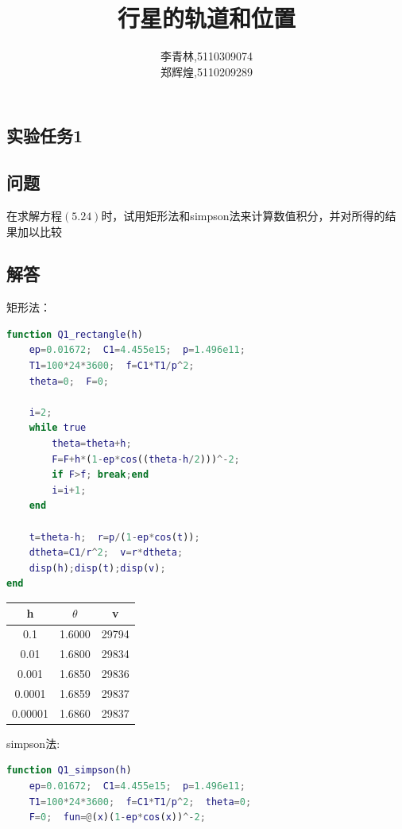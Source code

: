 \documentclass[12pt]{article}
\begin{document}
\begin{CJK*}{UTF8}{gbsn}

\date{}
\title{行星的轨道和位置}
\author{李青林,5110309074\\郑辉煌,5110209289}
\maketitle

\section{实验任务1}
\subsection*{问题}
在求解方程$(5.24)$时，试用矩形法和simpson法来计算数值积分，并对所得的结果加以比较

\subsection*{解答}
矩形法：\\
\begin{lstlisting}[language = matlab]
function Q1_rectangle(h)
    ep=0.01672;  C1=4.455e15;  p=1.496e11;
    T1=100*24*3600;  f=C1*T1/p^2;
    theta=0;  F=0;

    i=2;
    while true
        theta=theta+h;
        F=F+h*(1-ep*cos((theta-h/2)))^-2;
        if F>f; break;end
        i=i+1;
    end

    t=theta-h;  r=p/(1-ep*cos(t));
    dtheta=C1/r^2;  v=r*dtheta;
    disp(h);disp(t);disp(v);
end

\end{lstlisting}

\begin{tabular}{|c|c|c|}
\hline
h & $\theta$ & v \\
\hline
0.1 & 1.6000 & 29794 \\
\hline
0.01 & 1.6800 & 29834 \\
\hline
0.001 & 1.6850 & 29836 \\
\hline
0.0001 & 1.6859 & 29837 \\
\hline
0.00001 & 1.6860 & 29837 \\
\hline
\end{tabular}

simpson法:\\
\begin{lstlisting}[language = matlab]
function Q1_simpson(h)
    ep=0.01672;  C1=4.455e15;  p=1.496e11;
    T1=100*24*3600;  f=C1*T1/p^2;  theta=0;
    F=0;  fun=@(x)(1-ep*cos(x))^-2;


\end{lstlisting}
\end{CJK*}
\end{document}
